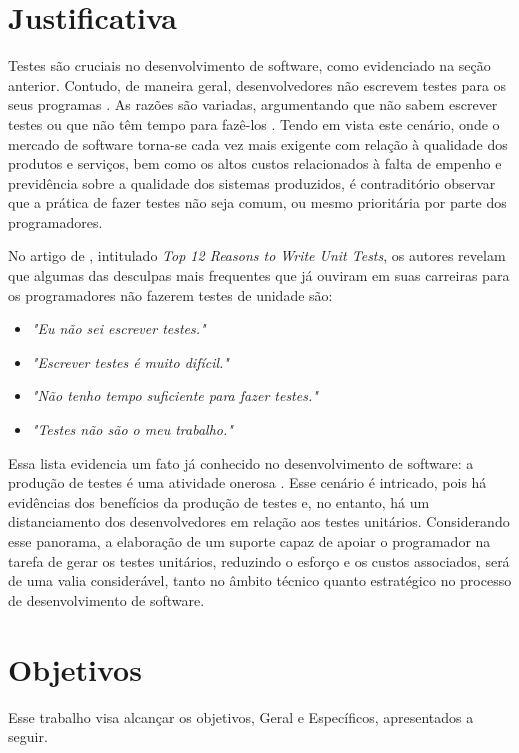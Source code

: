 \section{Justificativa}
Testes são cruciais no desenvolvimento de software, como evidenciado na seção
anterior. Contudo, de maneira geral, desenvolvedores não escrevem testes para
os seus programas \cite{burkeCoyner2003}. As razões são variadas, argumentando
que não sabem escrever testes ou que não têm tempo para fazê-los
\cite{burkeCoyner2003}. Tendo em vista este cenário, onde o mercado de
software torna-se cada vez mais exigente com relação à qualidade dos produtos
e serviços, bem como os altos custos relacionados à falta de empenho e
previdência sobre a qualidade dos sistemas produzidos, é contraditório
observar que a prática de fazer testes não seja comum, ou mesmo prioritária
por parte dos programadores.
\par
\indent No artigo de , intitulado
\textit{Top 12 Reasons to Write Unit Tests}, os autores revelam que algumas das
desculpas mais frequentes que já ouviram em suas carreiras para os
programadores não fazerem testes de unidade são:
  \begin{itemize}
    \item \textit{"Eu não sei escrever testes."}

    \item \textit{"Escrever testes é muito difícil."}

    \item \textit{"Não tenho tempo suficiente para fazer testes."}

    \item \textit{"Testes não são o meu trabalho."}
  \end{itemize}
\par
\indent Essa lista evidencia um fato já conhecido no desenvolvimento de
software: a produção de testes é uma atividade onerosa \cite{barbosaEtAl2009}.
Esse cenário é intricado, pois há evidências dos benefícios da produção de
testes e, no entanto, há um distanciamento dos desenvolvedores em relação aos
testes unitários. Considerando esse panorama, a elaboração de um suporte capaz
de apoiar o programador na tarefa de gerar os testes unitários, reduzindo o
esforço e os custos associados, será de uma valia considerável, tanto no âmbito
técnico quanto estratégico no processo de desenvolvimento de software.


\section{Objetivos}
Esse trabalho visa alcançar os objetivos, Geral e Específicos, apresentados a
seguir.

